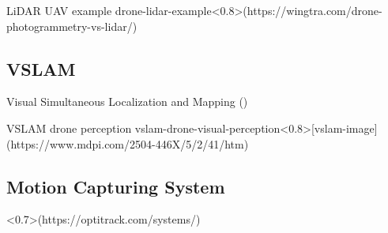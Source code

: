 {LiDAR UAV example}
{drone-lidar-example}<0.8>(https://wingtra.com/drone-photogrammetry-vs-lidar/)


\subsection{VSLAM}
Visual Simultaneous Localization and Mapping ()

\cite{vslam-for-drone-localization}

{VSLAM drone perception}
{vslam-drone-visual-perception}<0.8>[vslam-image](https://www.mdpi.com/2504-446X/5/2/41/htm)

\subsection{Motion Capturing System}
<0.7>(https://optitrack.com/systems/)




